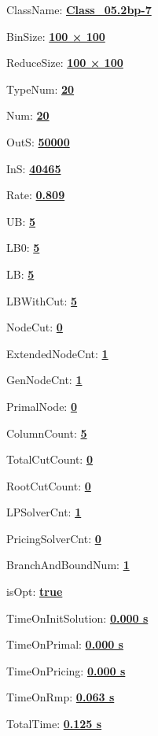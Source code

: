\documentclass[11pt]{article}
\begin{document}
\pagestyle{empty}


ClassName: \underline{\textbf{Class_05.2bp-7}}
\par
BinSize: \underline{\textbf{100 × 100}}
\par
ReduceSize: \underline{\textbf{100 × 100}}
\par
TypeNum: \underline{\textbf{20}}
\par
Num: \underline{\textbf{20}}
\par
OutS: \underline{\textbf{50000}}
\par
InS: \underline{\textbf{40465}}
\par
Rate: \underline{\textbf{0.809}}
\par
UB: \underline{\textbf{5}}
\par
LB0: \underline{\textbf{5}}
\par
LB: \underline{\textbf{5}}
\par
LBWithCut: \underline{\textbf{5}}
\par
NodeCut: \underline{\textbf{0}}
\par
ExtendedNodeCnt: \underline{\textbf{1}}
\par
GenNodeCnt: \underline{\textbf{1}}
\par
PrimalNode: \underline{\textbf{0}}
\par
ColumnCount: \underline{\textbf{5}}
\par
TotalCutCount: \underline{\textbf{0}}
\par
RootCutCount: \underline{\textbf{0}}
\par
LPSolverCnt: \underline{\textbf{1}}
\par
PricingSolverCnt: \underline{\textbf{0}}
\par
BranchAndBoundNum: \underline{\textbf{1}}
\par
isOpt: \underline{\textbf{true}}
\par
TimeOnInitSolution: \underline{\textbf{0.000 s}}
\par
TimeOnPrimal: \underline{\textbf{0.000 s}}
\par
TimeOnPricing: \underline{\textbf{0.000 s}}
\par
TimeOnRmp: \underline{\textbf{0.063 s}}
\par
TotalTime: \underline{\textbf{0.125 s}}
\par
\newpage


\end{document}
